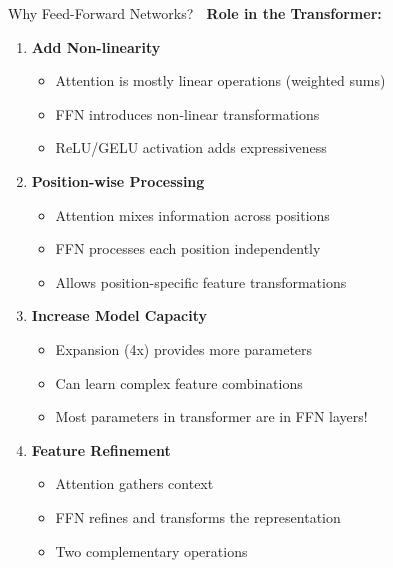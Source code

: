 \documentclass[aspectratio=169]{beamer}
\begin{document}
\begin{frame}[shrink=10]{Why Feed-Forward Networks? 🤔}
\textbf{Role in the Transformer:}

\vspace{1em}

\begin{enumerate}\setlength{\itemsep}{0pt}
    \item \textbf{Add Non-linearity}
    \begin{itemize}\setlength{\itemsep}{0pt}
        \item Attention is mostly linear operations (weighted sums)
        \item FFN introduces non-linear transformations
        \item ReLU/GELU activation adds expressiveness
    \end{itemize}

    \vspace{0.5em}

    \item \textbf{Position-wise Processing}
    \begin{itemize}\setlength{\itemsep}{0pt}
        \item Attention mixes information across positions
        \item FFN processes each position independently
        \item Allows position-specific feature transformations
    \end{itemize}

    \vspace{0.5em}

    \item \textbf{Increase Model Capacity}
    \begin{itemize}\setlength{\itemsep}{0pt}
        \item Expansion (4x) provides more parameters
        \item Can learn complex feature combinations
        \item Most parameters in transformer are in FFN layers!
    \end{itemize}

    \vspace{0.5em}

    \item \textbf{Feature Refinement}
    \begin{itemize}\setlength{\itemsep}{0pt}
        \item Attention gathers context
        \item FFN refines and transforms the representation
        \item Two complementary operations
    \end{itemize}
\end{enumerate}
\end{frame}
\end{document}

